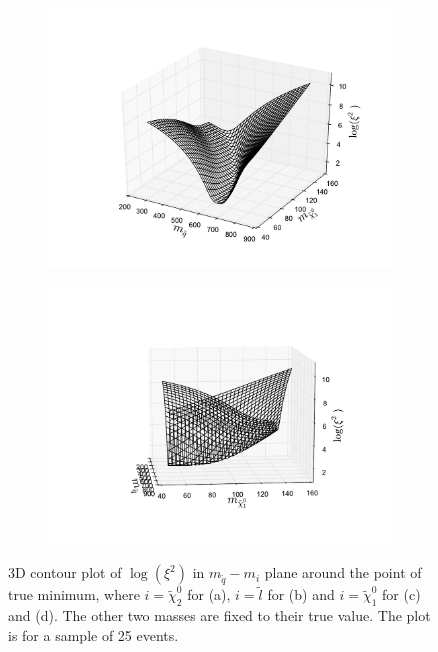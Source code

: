 \documentclass[twoside,english]{uiofysmaster}
\begin{document}
\begin{figure}[hbt]
	\begin{subfigure}[b]{0.49\textwidth}
		\includegraphics[width=\textwidth]{figures/3D_plot_xisquared_25_herwig_events_squark-chi1.pdf} 
		\caption{}
		\label{fig:3D_masses3}
	\end{subfigure}
	\begin{subfigure}[b]{0.49\textwidth}
		\includegraphics[width=\textwidth]{figures/3D_plot_xisquared_25_herwig_events_squark-chi1_rotated.pdf} 
		\caption{}
		\label{fig:3D_masses4}
	\end{subfigure}
	\caption{3D contour plot of $\log(\xi^2)$ in $m_{\tilde q}-m_i$ plane around the point of true minimum, where $i=\tilde \chi_2^0$ for (a), $i=\tilde l$ for (b) and $i=\tilde \chi_1^0$ for (c) and (d). The other two masses are fixed to their true value. The plot is for a sample of 25 events.}
	\label{fig:3D_masses_herwig}
\end{figure}
\end{document}
